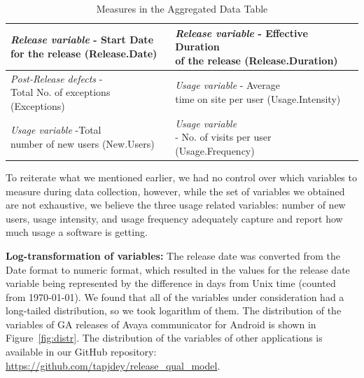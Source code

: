 \documentclass[smallcondensed]{svjour3}     %
\begin{document}
\begin{table}
\caption{Measures in the Aggregated Data Table}\label{t:finalvarss}
\begin{tabular}{|l|l|}\hline
\pbox{6cm}{\textit{Release variable} - Start Date \\for the release (Release.Date)} & \pbox{6cm}{\textit{Release variable} - Effective Duration \\of the release (Release.Duration)}\\\hline
\pbox{6cm}{\textit{Post-Release defects} - \\Total No. of exceptions (Exceptions)}  &  \pbox{6cm}{\textit{Usage variable} - Average\\ time on site per user (Usage.Intensity)}\\\hline
\pbox{6cm}{\textit{Usage variable} -Total\\ number of new users (New.Users)} & \pbox{6cm}{\textit{Usage variable} \\- No. of visits per user (Usage.Frequency)}\\\hline
\end{tabular}
\vspace{-10pt}
\end{table}

To reiterate what we mentioned earlier, we had no control over which variables to measure during data collection, however, while the set of variables we obtained are not exhaustive, we believe the three usage related variables: number of new users, usage intensity, and usage frequency adequately capture and report how much usage a software is getting. 

\noindent
\textbf{Log-transformation of variables:}
The release date was converted from the Date format to numeric format, which 
resulted in the values for the release date variable being represented by the 
difference in days from Unix time (counted from 1970-01-01).
We found that all of the variables under consideration
had a long-tailed distribution, so we took logarithm of them. 
The distribution of the variables of GA releases of Avaya communicator 
for Android is shown in Figure~\ref{fig:distr}.
The distribution of the variables of other applications  is available in our GitHub repository: \url{https://github.com/tapjdey/release\_qual\_model}.
\end{document}
